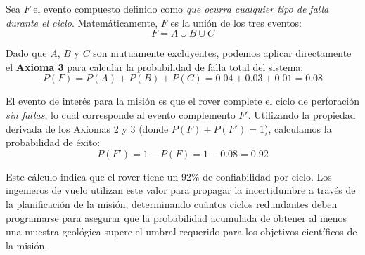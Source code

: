 Sea $F$ el evento compuesto definido como \textit{que ocurra cualquier tipo de falla durante el ciclo}. Matemáticamente, $F$ es la unión de los tres eventos:
$$ F = A \cup B \cup C $$

Dado que $A$, $B$ y $C$ son mutuamente excluyentes, podemos aplicar directamente el \textbf{Axioma 3} para calcular la probabilidad de falla total del sistema:
$$ P(F) = P(A) + P(B) + P(C) = 0.04 + 0.03 + 0.01 = 0.08 $$

El evento de interés para la misión es que el rover complete el ciclo de perforación \textit{sin fallas}, lo cual corresponde al evento complemento $F'$. Utilizando la propiedad derivada de los Axiomas 2 y 3 (donde $P(F) + P(F') = 1$), calculamos la probabilidad de éxito:
$$ P(F') = 1 - P(F) = 1 - 0.08 = 0.92 $$

Este cálculo indica que el rover tiene un 92\% de confiabilidad por ciclo. Los ingenieros de vuelo utilizan este valor para propagar la incertidumbre a través de la planificación de la misión, determinando cuántos ciclos redundantes deben programarse para asegurar que la probabilidad acumulada de obtener al menos una muestra geológica supere el umbral requerido para los objetivos científicos de la misión.